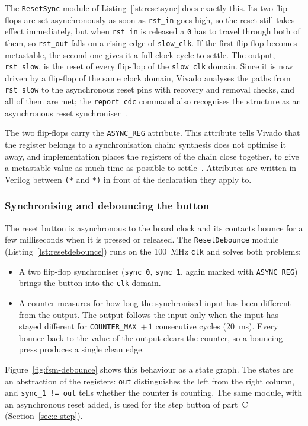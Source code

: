 \documentclass{article}
\begin{document}
The \texttt{ResetSync} module of Listing~\ref{lst:resetsync} does exactly this.
Its two flip-flops are set asynchronously as soon as \texttt{rst\_in} goes high,
so the reset still takes effect immediately, but when \texttt{rst\_in} is
released a \texttt{0} has to travel through both of them, so \texttt{rst\_out}
falls on a rising edge of \texttt{slow\_clk}. If the first flip-flop becomes
metastable, the second one gives it a full clock cycle to settle. The output,
\texttt{rst\_slow}, is the reset of every flip-flop of the \texttt{slow\_clk}
domain. Since it is now driven by a flip-flop of the same clock domain,
Vivado analyses the paths from \texttt{rst\_slow} to the asynchronous reset
pins with recovery and removal checks, and all of them are met; the
\texttt{report\_cdc} command also recognises the structure as an asynchronous
reset synchroniser~\cite[Report CDC]{ug949}.



The two flip-flops carry the \texttt{ASYNC\_REG} attribute. This attribute tells
Vivado that the register belongs to a synchronisation chain: synthesis does not
optimise it away, and implementation places the registers of the chain close
together, to give a metastable value as much time as possible to settle~\cite[ASYNC\_REG]{ug901}.
Attributes are written in Verilog between \texttt{(*} and \texttt{*)} in front of
the declaration they apply to.

\subsubsection{Synchronising and debouncing the button}
\label{sec:b-debounce}
The reset button is asynchronous to the board clock and its contacts bounce
for a few milliseconds when it is pressed or released. The \texttt{ResetDebounce}
module (Listing~\ref{lst:resetdebounce}) runs on the \SI{100}{\mega\hertz}
\texttt{clk} and solves both problems:
\begin{itemize}
  \item A two flip-flop synchroniser (\texttt{sync\_0}, \texttt{sync\_1}, again
        marked with \texttt{ASYNC\_REG}) brings the button into the \texttt{clk}
        domain.
  \item A counter measures for how long the synchronised input has been different
        from the output. The output follows the input only when the input has stayed
        different for \texttt{COUNTER\_MAX}~$+\,1$ consecutive cycles
        (\SI{20}{\milli\second}). Every bounce back to the value of the output
        clears the counter, so a bouncing press produces a single clean edge.
\end{itemize}
Figure~\ref{fig:fsm-debounce} shows this behaviour as a state graph. The states
are an abstraction of the registers: \texttt{out} distinguishes the left from the
right column, and \texttt{sync\_1 != out} tells whether the counter is counting.
The same module, with an asynchronous reset added, is used for the step button of
part~C (Section~\ref{sec:c-step}).
\end{document}
